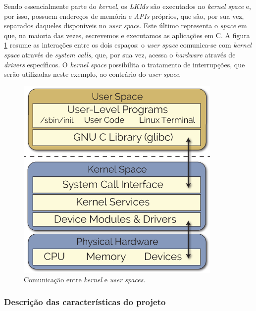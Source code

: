 \vspace{12pt}

Sendo essencialmente parte do \textit{kernel}, os \textit{LKMs} são executados
no \textit{kernel space} e, por isso, possuem endereços de memória e
\textit{APIs} próprios, que são, por sua vez, separados daqueles
disponíveis no \textit{user space}. Este último representa o \textit{space} em
que, na maioria das vezes, escrevemos e executamos as aplicações em C. A figura
\ref{fig:derek_kernel_user} resume as interações entre os dois espaços: o
\textit{user space} comunica-se com \textit{kernel space} através de
\textit{system calls}, que, por sua vez, acessa o \textit{hardware} através de
\textit{drivers} específicos. O \textit{kernel space} possibilita o tratamento
de interrupções, que serão utilizadas neste exemplo, ao contrário do
\textit{user space}.

\FloatBarrier

\begin{figure}[h]

\centering
\includegraphics[scale=0.55]{image/userspace-kernelspace}
\caption {Comunicação entre \textit{kernel} e \textit{user spaces}.}
\label{fig:derek_kernel_user}
\end{figure}

\FloatBarrier

\vspace{-12pt}

\subsubsection{Descrição das características do projeto}


